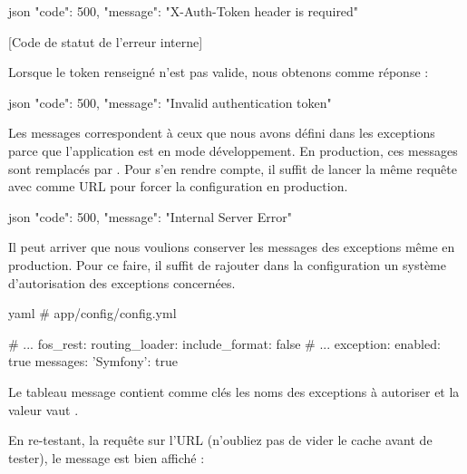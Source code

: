 \documentclass[big]{zmdocument}
\begin{document}
\begin{CodeBlock}{json}
{
  "code": 500,
  "message": "X-Auth-Token header is required"
}
\end{CodeBlock}



[Code de statut de l'erreur interne]


Lorsque le token renseigné n'est pas valide, nous obtenons comme réponse :



\begin{CodeBlock}{json}
{
  "code": 500,
  "message": "Invalid authentication token"
}
\end{CodeBlock}



Les messages correspondent à ceux que nous avons défini dans les exceptions parce que l'application est en mode développement. En production, ces messages sont remplacés par .
Pour s'en rendre compte, il suffit de lancer la même requête avec comme URL  pour forcer la configuration en production.



\begin{CodeBlock}{json}
{
  "code": 500,
  "message": "Internal Server Error"
}
\end{CodeBlock}



Il peut arriver que nous voulions conserver les messages des exceptions même en production. Pour ce faire, il suffit de rajouter dans la configuration un système d'autorisation des exceptions concernées.



\begin{CodeBlock}{yaml}
# app/config/config.yml

# ...
fos_rest:
    routing_loader:
        include_format: false
    # ...
    exception:
        enabled: true
        messages:
            'Symfony\Component\Security\Core\Exception\BadCredentialsException': true
\end{CodeBlock}



Le tableau message contient comme clés les noms des exceptions à autoriser et la valeur vaut .



En re-testant, la requête sur l'URL  (n'oubliez pas de vider le cache avant de tester), le message est bien affiché :
\end{document}
